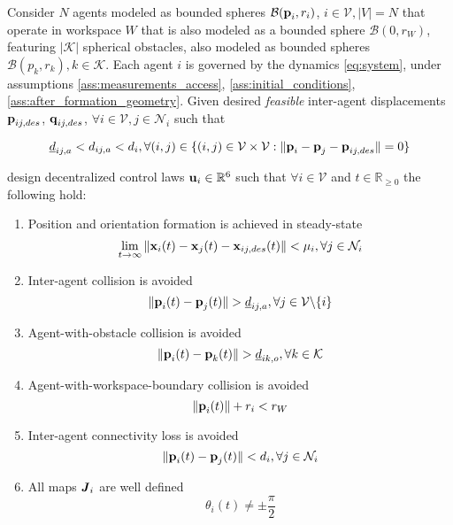 \begin{bg_box}
\begin{problem}
  Consider $N$ agents modeled as bounded spheres $\mathcal{B}(\bm{\mathbf{p}}_i, r_i)$,
  $i \in \mathcal{V}, |V| = N$ that operate in workspace $W$ that is also modeled
  as a bounded sphere $\mathcal{B}(0,r_W)$, featuring $|\mathcal{K}|$ spherical obstacles,
  also modeled as bounded spheres $\mathcal{B}(p_k, r_k), k \in \mathcal{K}$.
  Each agent $i$ is governed by the dynamics \eqref{eq:system}, under assumptions
  \ref{ass:measurements_access}, \ref{ass:initial_conditions},
  \ref{ass:after_formation_geometry}. Given desired \textit{feasible}
  inter-agent displacements $\bm{\mathbf{p}}_{ij,des}$, $\bm{\mathbf{q}}_{ij,des}$,
  $\forall i \in \mathcal{V}, j \in \mathcal{N}_i$ such that

  $$\underline{d}_{ij,a} < d_{ij,a} < d_i, \forall (i,j) \in
  \{(i,j) \in \mathcal{V} \times \mathcal{V}:
  \|\bm{\mathbf{p}}_i - \bm{\mathbf{p}}_j - \bm{\mathbf{p}}_{ij,des}\| = 0\}$$

  design decentralized control laws $\bm{\mathbf{u}}_i \in \mathbb{R}^6$ such that
  $\forall i \in \mathcal{V}$ and $t \in \mathbb{R}_{\geq 0}$ the following
  hold:

  \begin{enumerate}

    \item Position and orientation formation is achieved in steady-state
      $$\lim_{t \to \infty} \|\bm{\mathbf{x}}_i(t) - \bm{\mathbf{x}}_j(t) - \bm{\mathbf{x}}_{ij,des}(t)\| < \mu_i,
        \forall j \in \mathcal{N}_i$$

    \item Inter-agent collision is avoided
      $$\|\bm{\mathbf{p}}_i(t) - \bm{\mathbf{p}}_j(t)\| > \underline{d}_{ij,a},
      \forall j \in \mathcal{V} \backslash \{i\}$$

    \item Agent-with-obstacle collision is avoided
      $$\|\bm{\mathbf{p}}_i(t) - \bm{\mathbf{p}}_k(t)\| > \underline{d}_{ik,o},
      \forall k \in \mathcal{K}$$

    \item Agent-with-workspace-boundary collision is avoided
      $$\|\bm{\mathbf{p}}_i(t)\| + r_i < r_W$$

    \item Inter-agent connectivity loss is avoided
      $$\|\bm{\mathbf{p}}_i(t) - \bm{\mathbf{p}}_j(t)\| < d_i,
      \forall j \in \mathcal{N}_i$$

    \item All maps $\bm{\mathit{J}}_i$ are well defined
      $$\theta_i(t) \ne \pm \frac{\pi}{2}$$

  \end{enumerate}
\label{problem}
\end{problem}
\end{bg_box}
